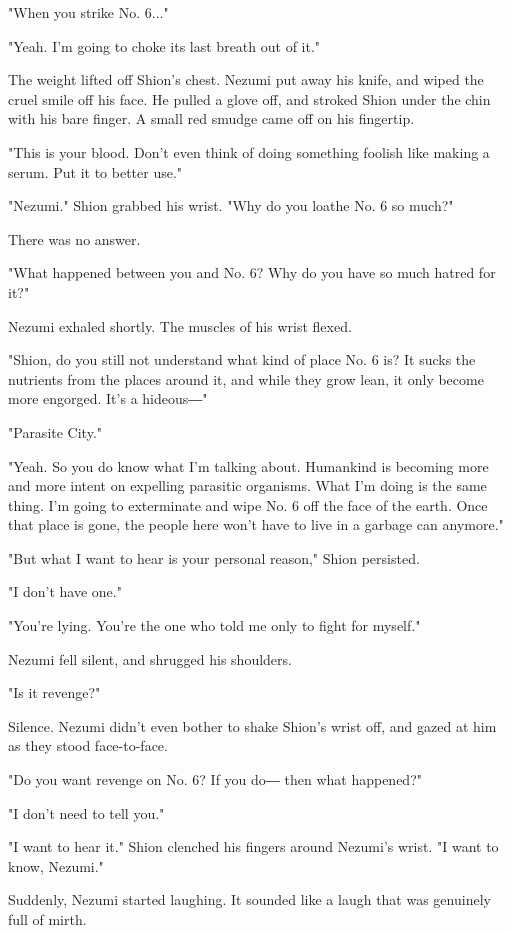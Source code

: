 "When you strike No. 6..."

"Yeah. I'm going to choke its last breath out of it."

The weight lifted off Shion's chest. Nezumi put away his knife, and
wiped the cruel smile off his face. He pulled a glove off, and stroked
Shion under the chin with his bare finger. A small red smudge came off
on his fingertip.

"This is your blood. Don't even think of doing something foolish like
making a serum. Put it to better use."

"Nezumi." Shion grabbed his wrist. "Why do you loathe No. 6 so much?"

There was no answer.

"What happened between you and No. 6? Why do you have so much hatred for
it?"

Nezumi exhaled shortly. The muscles of his wrist flexed.

"Shion, do you still not understand what kind of place No. 6 is? It
sucks the nutrients from the places around it, and while they grow lean,
it only become more engorged. It's a hideous―"

"Parasite City."

"Yeah. So you do know what I'm talking about. Humankind is becoming more
and more intent on expelling parasitic organisms. What I'm doing is the
same thing. I'm going to exterminate and wipe No. 6 off the face of the
earth. Once that place is gone, the people here won't have to live in a
garbage can anymore."

"But what I want to hear is your personal reason," Shion persisted.

"I don't have one."

"You're lying. You're the one who told me only to fight for myself."

Nezumi fell silent, and shrugged his shoulders.

"Is it revenge?"

Silence. Nezumi didn't even bother to shake Shion's wrist off, and gazed
at him as they stood face-to-face.

"Do you want revenge on No. 6? If you do― then what happened?"

"I don't need to tell you."

"I want to hear it." Shion clenched his fingers around Nezumi's wrist.
"I want to know, Nezumi."

Suddenly, Nezumi started laughing. It sounded like a laugh that was
genuinely full of mirth.

